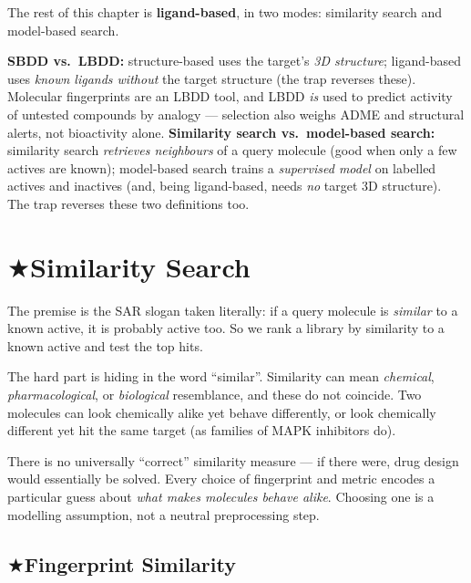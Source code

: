 \documentclass[11pt, oneside]{book}
\makeatletter
\newcommand{\starglyph}{\textcolor{stargold}{\ensuremath{\bigstar}}}
\newcommand{\starsec}[1]{%
  \texorpdfstring{\starglyph\hspace{0.4em}\textcolor{star@frame}{#1}}{#1}}
\makeatother
\begin{document}
\noindent The rest of this chapter is \textbf{ligand-based}, in two modes:
similarity search and model-based search.

\begin{starbox}[title={Exam-critical: four definitions students swap}]
\textbf{SBDD vs.\ LBDD:} structure-based uses the target's \emph{3D structure};
ligand-based uses \emph{known ligands without} the target structure (the trap
reverses these). Molecular fingerprints are an LBDD tool, and LBDD \emph{is} used to
predict activity of untested compounds by analogy --- selection also weighs ADME and
structural alerts, not bioactivity alone. \textbf{Similarity search vs.\ model-based
search:} similarity search \emph{retrieves neighbours} of a query molecule (good
when only a few actives are known); model-based search trains a \emph{supervised
model} on labelled actives and inactives (and, being ligand-based, needs \emph{no}
target 3D structure). The trap reverses these two definitions too.
\end{starbox}

\section{\starsec{Similarity Search}}

The premise is the SAR slogan taken literally: if a query molecule is
\emph{similar} to a known active, it is probably active too. So we rank a library
by similarity to a known active and test the top hits.

The hard part is hiding in the word ``similar''. Similarity can mean
\emph{chemical}, \emph{pharmacological}, or \emph{biological} resemblance, and
these do not coincide. Two molecules can look chemically alike yet behave
differently, or look chemically different yet hit the same target (as families of
MAPK inhibitors do).

\begin{intbox}
There is no universally ``correct'' similarity measure --- if there were, drug
design would essentially be solved. Every choice of fingerprint and metric encodes
a particular guess about \emph{what makes molecules behave alike}. Choosing one is
a modelling assumption, not a neutral preprocessing step.
\end{intbox}

\subsection{\starsec{Fingerprint Similarity}}
\end{document}
